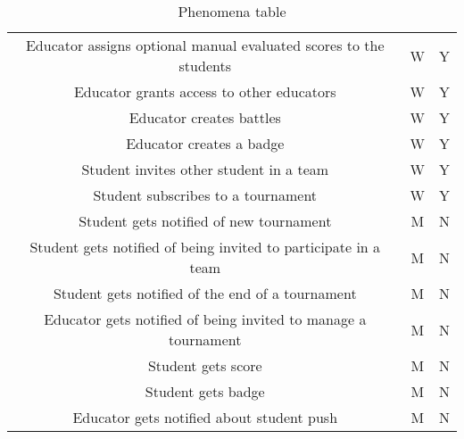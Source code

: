 \begin{center}
\begin{table}[h]
\begin{tabularx}{\textwidth}{| c| c| c|}
            Educator assigns optional manual evaluated scores to the students     & W                & Y          \\
            Educator grants access to other educators                             & W                & Y          \\
            Educator creates battles                                              & W                & Y          \\
            Educator creates a badge                                              & W                & Y          \\
            Student invites other student in a team                               & W                & Y          \\
            Student subscribes to a tournament                                    & W                & Y          \\
            Student gets notified of new tournament                               & M                & N          \\
            Student gets notified of being invited to participate in a team       & M                & N          \\
            Student gets notified of the end of a tournament                      & M                & N          \\
            Educator gets notified of being invited to manage a tournament        & M                & N          \\
            Student gets score                                                    & M                & N          \\
            Student gets badge                                                    & M                & N          \\
            Educator gets notified about student push                             & M                & N          \\
            \hline
        \end{tabularx}
        \caption{Phenomena table}
    \end{table}
\end{center}

